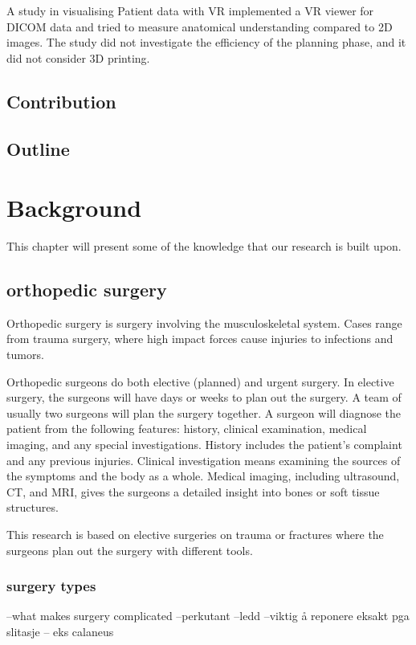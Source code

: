 \documentclass[a4paper]{report}
\begin{document}
A study in visualising Patient data with VR\cite{vertemati_virtual_2019} implemented a VR viewer for DICOM data and tried to measure anatomical understanding compared to 2D images. The study did not investigate the efficiency of the planning phase, and it did not consider 3D printing.

\section{Contribution}
\section{Outline}

\chapter{Background}\label{Background}
This chapter will present some of the knowledge that our research is built upon. 

\section{orthopedic surgery}

Orthopedic surgery is surgery involving the musculoskeletal system. Cases range from trauma surgery, where high impact forces cause injuries to infections and tumors\cite{manual ortho}.

Orthopedic surgeons do both elective (planned) and urgent surgery. In elective surgery, the surgeons will have days or weeks to plan out the surgery. A team of usually two surgeons will plan the surgery together.
A surgeon will diagnose the patient from the following features: history, clinical examination, medical imaging, and any special investigations. History includes the patient's complaint and any previous injuries. Clinical investigation means examining the sources of the symptoms and the body as a whole. Medical imaging, including ultrasound, CT, and MRI, gives the surgeons a detailed insight into bones or soft tissue structures.

This research is based on elective surgeries on trauma or fractures where the surgeons plan out the surgery with different tools.

\subsection{surgery types}
--what makes surgery complicated
--perkutant
--ledd
--viktig å reponere eksakt pga slitasje
-- eks calaneus
\end{document}
